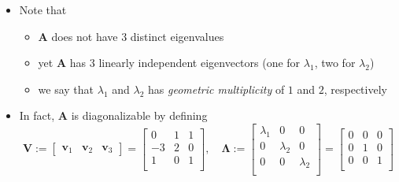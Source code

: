 \documentclass[12pt,a4paper]{article}
\begin{document}
\begin{itemize}
\begin{itemize}
  \item Note that
    \begin{itemize}
    \item $\bm{A}$ does not have $3$ distinct eigenvalues
    \item yet $\bm{A}$ has $3$ linearly independent eigenvectors (one for $\lambda_{1}$, two for $\lambda_{2}$)
    \item we say that $\lambda_{1}$ and $\lambda_{2}$ has \emph{geometric multiplicity} of $1$ and $2$, respectively
    \end{itemize}

  \item In fact, $\bm{A}$ is diagonalizable by defining
    \begin{equation}\nonumber%
      \bm{V}:=
      \begin{bmatrix}
        \bm{v}_{1} & \bm{v}_{2} & \bm{v}_{3}
      \end{bmatrix}
      =
      \begin{bmatrix}
        0 & 1 & 1 \\
        -3 & 2 & 0\\
        1 & 0 & 1 \\
      \end{bmatrix},
      \quad
      \bm{\Lambda}:=
      \begin{bmatrix}
        \lambda_{1} & 0 & 0 \\
        0 & \lambda_{2} & 0 \\
        0 & 0 & \lambda_{2} \\
      \end{bmatrix}
      =
      \begin{bmatrix}
        0 & 0 & 0 \\
        0 & 1 & 0 \\
        0 & 0 & 1 \\
      \end{bmatrix}
    \end{equation}


\end{itemize}
\end{itemize}
\end{document}
